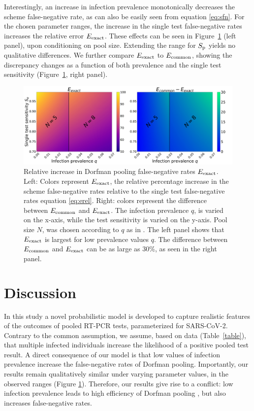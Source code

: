 \documentclass{article}
\begin{document}
Interestingly, an increase in infection prevalence monotonically
decreases the scheme false-negative rate, as can also be easily seen
from equation \eqref{eq:sfn}. For the chosen parameter ranges, the
increase in the single test false-negative rates increases the
relative error $E_{\text{{exact}}}$. These effects can be seen in
Figure~\ref{fig1} (left panel), upon conditioning on pool
size. Extending the range for $S_\text{p}$ yields no qualitative
differences. We further compare $E_{\text{{exact}}}$ to $E_{\text{{common}}}$,
showing the discrepancy changes as a function of both prevalence and
the single test sensitivity (Figure~\ref{fig1}, right panel).
\begin{figure}[H]
  \centering
  \includegraphics[width=\textwidth]{heatmap_sfn.jpg}
  \caption{Relative increase in Dorfman pooling false-negative rates
    $E_{\text{{exact}}}$. Left: Colors represent $E_{\text{{exact}}}$, the relative
    percentage increase in the scheme false-negative rates relative to
    the single test false-negative rates equation \eqref{eq:erel}. Right:
    colors represent the difference between $E_{\text{{common}}}$ and
    $E_{\text{{exact}}}$. The infection prevalence $q$, is varied on the
    x-axis, while the test sensitivity is varied on the y-axis. Pool
    size $N$, was chosen according to $q$ as in
    \cite{DorfmanYuvalDor}. The left panel shows that $E_{\text{{exact}}}$ is
    largest for low prevalence values $q$. The difference between
    $E_{\text{{common}}}$ and $E_{\text{{exact}}}$ can be as large as 30\%, as seen
    in the right panel.}\label{fig1}
\end{figure}

\section*{Discussion}
In this study a novel probabilistic model is developed to capture
realistic features of the outcomes of pooled RT-PCR tests,
parameterized for SARS-CoV-2. Contrary to the common assumption, we
assume, based on data (Table~\ref{table}), that multiple infected
individuals increase the likelihood of a positive pooled test
result. A direct consequence of our model is that low values of
infection prevalence increase the false-negative rates of Dorfman
pooling. Importantly, our results remain qualitatively similar under
varying parameter values, in the observed ranges
\cite{KitComparison,EstimatingRatesKucrika, EstimatingRatesLourenco,
  InterpretingCOVID19Test} (Figure \ref{fig1}). Therefore, our results
give rise to a conflict: low infection prevalence leads to high
efficiency of Dorfman pooling \cite{DorfmanYuvalDor}, but also
increases false-negative rates.
\end{document}
